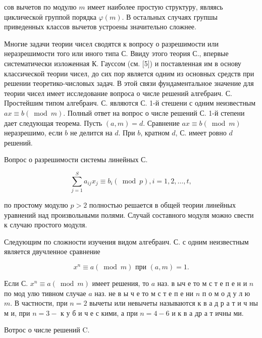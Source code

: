 \documentclass[10pt]{article}
\begin{document}
сов вычетов по модулю $m$ имеет наиболее простую структуру, являясь циклическоӥ группой порядка $\varphi(m)$. В остальных случаях групшы приведенных классов вычетов устроены значительно сложнее.



Многие задачи теории чисел сводятся к вопросу о разрешимости или неразрешимости того или иного типа С. Ввиду этого теория С., впервые систематически изложенная К. Гауссом (см. [5]) и поставленная им в основу классической теории чисел, до сих пор является одним из основных средств при решении теоретико-числовых задач. В этой связи фундаментальное значение для теории чисел имеет исследование вопроса о числе решений алгебраич. С. Простейшим типом алгебраич. С. являются С. 1-й стешени с одним неизвестным $a x \equiv b(\bmod m)$. Полный ответ на вопрос о числе решений С. 1-й степени дает следующая теорема. Пусть $(a, m)=d$. Сравнение $a x \equiv b(\bmod m)$ неразрешимо, если $b$ не делится на $d$. При $b$, кратном $d$, С. имеет ровно $d$ решений.



Вопрос о разрешимости системы линейных С.



\[

\sum_{j=1}^{S} a_{i j} x_{j} \equiv b_{i}(\bmod p), i=1,2, \ldots, t,

\]



по простому модулю $p>2$ полностью решается в общей теории линейных уравнений над произвольными полями. Случай составного модуля можно свести к случаю простого модуля.



Следующим по сложности изучения видом алгебраич. С. с одним неизвестным является двучленное сравнение



\[

x^{n} \equiv a(\bmod m) \text { при }(a, m)=1 .

\]



Если С. $x^{n} \equiv a(\bmod m)$ имеет решения, то $a$ наз. в ыч е то м с т е п е н и $n$ по мод улю тивном случае $a$ наз. не в ы ч е то м с т е п е ни $n$ п о м о д у л ю $m$. В частности, при $n=2$ вычеты или невычеты называются к в а д р а т и ч ны м и, при $n=3-$ к у б и ч е с кими, а при $n=4-6$ и к в а др а т ичны ми.



Вотрос о числе решений $\mathrm{C}$.
\end{document}
